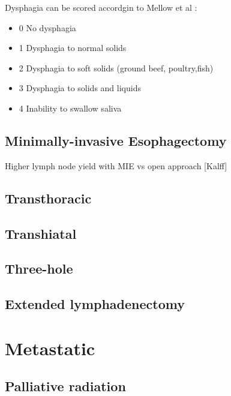 \documentclass[
]{book}
\providecommand{\tightlist}{%
  \setlength{\itemsep}{0pt}\setlength{\parskip}{0pt}}
\begin{document}
Dysphagia can be scored accordgin to Mellow et al \citep{mellow1443}:

\begin{itemize}
\tightlist
\item
  0 No dysphagia
\item
  1 Dysphagia to normal solids
\item
  2 Dysphagia to soft solids (ground beef, poultry,fish)
\item
  3 Dysphagia to solids and liquids
\item
  4 Inability to swallow saliva
\end{itemize}

\hypertarget{minimally-invasive-esophagectomy}{%
\section{Minimally-invasive Esophagectomy}\label{minimally-invasive-esophagectomy}}

Higher lymph node yield with MIE vs open approach {[}Kalff{]}

\hypertarget{transthoracic}{%
\section{Transthoracic}\label{transthoracic}}

\hypertarget{transhiatal}{%
\section{Transhiatal}\label{transhiatal}}

\hypertarget{three-hole}{%
\section{Three-hole}\label{three-hole}}

\hypertarget{extended-lymphadenectomy}{%
\section{Extended lymphadenectomy}\label{extended-lymphadenectomy}}

\hypertarget{eso_metastatic}{%
\chapter{Metastatic}\label{eso_metastatic}}

\hypertarget{palliative-radiation}{%
\section{Palliative radiation}\label{palliative-radiation}}
\end{document}
